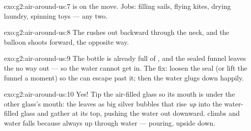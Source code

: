 \begin{solution}{exo:g2:air-around-us:7}
 is  on the move. Jobs: filling sails, flying kites, drying
laundry, spinning  toys --- any two.
\end{solution}

\begin{solution}{exo:g2:air-around-us:8}
The  rushes out backward through the neck, and the balloon shoots
forward, the opposite way.
\end{solution}

\begin{solution}{exo:g2:air-around-us:9}
The bottle is already full of , and the sealed funnel leaves the
 no way out --- so the water cannot get in. The fix: loosen the
seal (or lift the funnel a moment) so the  can escape past it;
then the water glugs down happily.
\end{solution}

\begin{solution}{exo:g2:air-around-us:10}
Yes! Tip the air-filled glass so its mouth is under the other glass's
mouth: the  leaves as big silver bubbles that rise \emph{up} into
the water-filled glass and gather at its top, pushing the water out
downward.  climbs and water falls because  always  up
through water --- pouring, upside down.
\end{solution}
